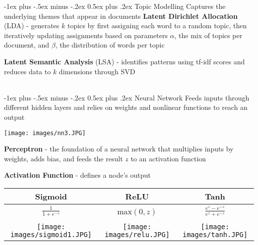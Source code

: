 \documentclass[10pt,landscape]{article}
\makeatletter
\renewcommand{\section}{\@startsection{section}{1}{0mm}%
                                {-1ex plus -.5ex minus -.2ex}%
                                {0.5ex plus .2ex}%
                                {\normalfont\large\bfseries}}
\renewcommand{\subsection}{\@startsection{subsection}{2}{0mm}%
                                {-1ex plus -.5ex minus -.2ex}%
                                {0.5ex plus .2ex}%
                                {\normalfont\normalsize\bfseries}}
\makeatother
\begin{document}
\begin{multicols}{3}
\subsection{Topic Modelling}
Captures the underlying themes that appear in documents
\textbf{Latent Dirichlet Allocation} (LDA) - generates $k$ topics by first assigning each word to a random topic, then iteratively updating assignments based on parameters $\alpha$, the mix of topics per document, and $\beta$, the distribution of words per topic

\textbf{Latent Semantic Analysis} (LSA) - identifies patterns using tf-idf scores and reduces data to $k$ dimensions through SVD
\columnbreak

\textcolor{white}{.}\vspace{-5mm}\\ %
\section{Neural Network}
Feeds inputs through different hidden layers and relies on weights and nonlinear functions to reach an output
\vspace{-1mm}
\begin{center}
    \texttt{[image: images/nn3.JPG]}
\end{center}
\vspace{-1mm}
\textbf{Perceptron} - the foundation of a neural network that multiplies inputs by weights, adds bias, and feeds the result $z$ to an activation function

\textbf{Activation Function} - defines a node's output 

\vspace{-1mm}
\begin{center}
\begin{tabular}{c|c|c} 
          Sigmoid & ReLU & Tanh\\
         \hline
         \rule{0pt}{3ex} 
         $\frac{1}{1+e^{-z}} $  & max$(0,z)$ & $\frac{e^z - e^{-z}}{e^z + e^{-z}}$\\
           &   &  \vspace{-2mm}\\
         
         \hline
         \texttt{[image: images/sigmoid1.JPG]} &
         \texttt{[image: images/relu.JPG]} &
         \texttt{[image: images/tanh.JPG]} 
         

\end{tabular}
\end{center}
\end{multicols}
\end{document}
